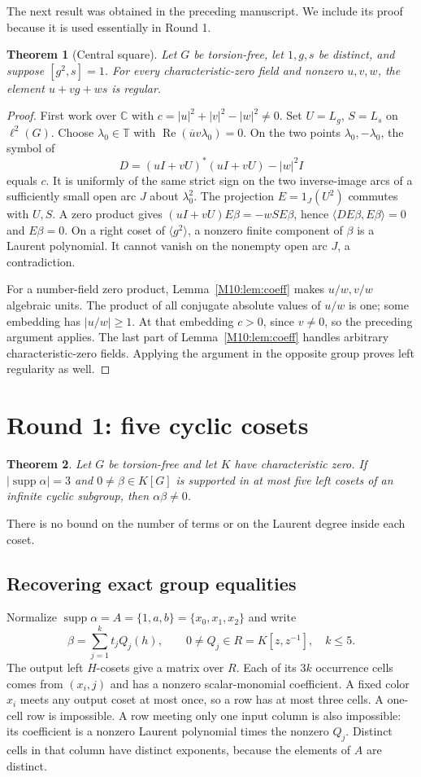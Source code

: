 \documentclass[11pt,a4paper,oneside]{report}
\newtheorem{theorem}{Theorem}[section]
\theoremstyle{definition}
\theoremstyle{remark}
\DeclareMathOperator{\supp}{supp}
\DeclareMathOperator{\Rea}{Re}
\newcommand{\C}{\mathbb C}
\newcommand{\T}{\mathbb T}
\begin{document}
The next result was obtained in the preceding manuscript. We include
its proof because it is used essentially in Round 1.
\begin{theorem}[Central square]\label{M10:thm:central-square}
Let $G$ be torsion-free, let $1,g,s$ be distinct, and suppose
$[g^2,s]=1$. For every characteristic-zero field and nonzero
$u,v,w$, the element $u+vg+ws$ is regular.
\end{theorem}
\begin{proof}
First work over $\C$ with
$c=|u|^2+|v|^2-|w|^2\ne0$. Set $U=L_g$, $S=L_s$ on $\ell^2(G)$.
Choose $\lambda_0\in\T$ with
$\Rea(\overline u v\lambda_0)=0$. On the two points
$\lambda_0,-\lambda_0$, the symbol of
\[
D=(uI+vU)^*(uI+vU)-|w|^2I
\]
equals $c$. It is uniformly of the same strict sign on the two
inverse-image arcs of a sufficiently small open arc $J$ about
$\lambda_0^2$. The projection $E=1_J(U^2)$ commutes with $U,S$.
A zero product gives $(uI+vU)E\beta=-wSE\beta$, hence
$\langle DE\beta,E\beta\rangle=0$ and $E\beta=0$.
On a right coset of $\langle g^2\rangle$, a nonzero finite
component of $\beta$ is a Laurent polynomial. It cannot vanish on
the nonempty open arc $J$, a contradiction.

For a number-field zero product, Lemma~\ref{M10:lem:coeff} makes
$u/w,v/w$ algebraic units. The product of all conjugate absolute
values of $u/w$ is one; some embedding has $|u/w|\ge1$.
At that embedding $c>0$, since $v\ne0$, so the preceding argument
applies. The last part of Lemma~\ref{M10:lem:coeff} handles arbitrary
characteristic-zero fields. Applying the argument in the opposite
group proves left regularity as well.
\end{proof}

\section{Round 1: five cyclic cosets}
\begin{theorem}\label{M10:thm:five}
Let $G$ be torsion-free and let $K$ have characteristic zero.
If $|\supp\alpha|=3$ and $0\ne\beta\in K[G]$ is supported in
at most five left cosets of an infinite cyclic subgroup, then
$\alpha\beta\ne0$.
\end{theorem}
There is no bound on the number of terms or on the Laurent degree
inside each coset.

\subsection{Recovering exact group equalities}
Normalize $\supp\alpha=A=\{1,a,b\}=\{x_0,x_1,x_2\}$ and write
\[
\beta=\sum_{j=1}^k t_jQ_j(h),\qquad
0\ne Q_j\in R=K[z,z^{-1}],\quad k\le5.
\]
The output left $H$-cosets give a matrix over $R$. Each of its
$3k$ occurrence cells comes from $(x_i,j)$ and has a nonzero
scalar-monomial coefficient. A fixed color $x_i$ meets any output
coset at most once, so a row has at most three cells. A one-cell
row is impossible. A row meeting only one input column is also
impossible: its coefficient is a nonzero Laurent polynomial times
the nonzero $Q_j$. Distinct cells in that column have distinct
exponents, because the elements of $A$ are distinct.
\end{document}
